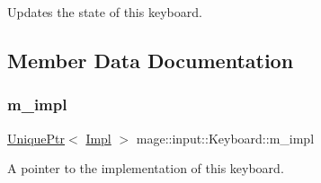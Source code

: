 Updates the state of this keyboard. 

\subsection{Member Data Documentation}
\mbox{\label{classmage_1_1input_1_1_keyboard_af693bedd8a7bc9ca0d1c130b84753f67}} 
\subsubsection{\texorpdfstring{m\+\_\+impl}{m\_impl}}
{\footnotesize\ttfamily \mbox{\hyperlink{namespacemage_a3316d7143a973e37adf1110f2e80ca31}{Unique\+Ptr}}$<$ \mbox{\hyperlink{classmage_1_1input_1_1_keyboard_1_1_impl}{Impl}} $>$ mage\+::input\+::\+Keyboard\+::m\+\_\+impl\hspace{0.3cm}{\ttfamily [private]}}

A pointer to the implementation of this keyboard. 